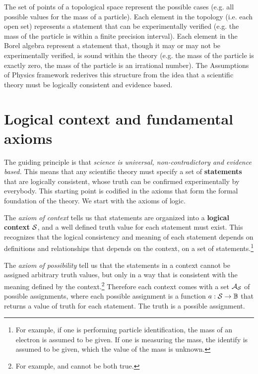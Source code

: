 \documentclass[10pt,twocolumn, nofootinbib]{revtex4-1}
\begin{document}
The set of points of a topological space represent the possible cases (e.g. all possible values for the mass of a particle). Each element in the topology (i.e. each open set) represents a statement that can be experimentally verified (e.g. the mass of the particle is within a finite precision interval). Each element in the Borel algebra represent a statement that, though it may or may not be experimentally verified, is sound within the theory (e.g. the mass of the particle is exactly zero, the mass of the particle is an irrational number). The Assumptions of Physics framework rederives this structure from the idea that a scientific theory must be logically consistent and evidence based.

\section{Logical context and fundamental axioms}

The guiding principle is that \emph{science is universal, non-contradictory and evidence based.} This means that any scientific theory must specify a set of \textbf{statements} that are logically consistent, whose truth can be confirmed experimentally by everybody. This starting point is codified in the axioms that form the formal foundation of the theory. We start with the axioms of logic.

The \emph{axiom of context} tells us that statements are organized into a \textbf{logical context} $\mathcal{S}$, and a well defined truth value for each statement must exist. This recognizes that the logical consistency and meaning of each statement depends on definitions and relationships that depends on the context, on a set of statements.\footnote{For example, if one is performing particle identification, the mass of an electron is assumed to be given. If one is measuring the mass, the identify is assumed to be given, which the value of the mass is unknown.}

The \emph{axiom of possibility} tell us that the statements in a context cannot be assigned arbitrary truth values, but only in a way that is consistent with the meaning defined by the context.\footnote{For example,  and  cannot be both true.} Therefore each context comes with a set $\mathcal{A}_{\mathcal{S}}$ of possible assignments, where each possible assignment is a function $a : \mathcal{S} \to \mathbb{B}$ that returns a value of truth for each statement. The truth is a possible assignment.
\end{document}
